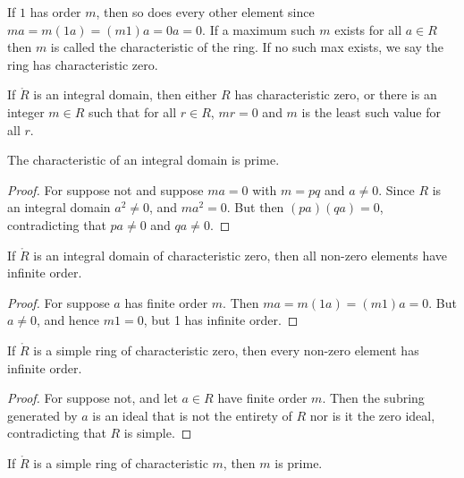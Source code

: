 \documentclass{book}                                                           %
\begin{document}
            If $1$ has order $m$, then so does every other element since
            $ma=m(1a)=(m1)a=0a=0$. If a maximum such $m$ exists for all
            $a\in{R}$ then $m$ is called the characteristic of the ring.
            If no such max exists, we say the ring has characteristic zero.
            \begin{theorem}
                If $\ring{R}$ is an integral domain, then either $R$ has
                characteristic zero, or there is an integer $m\in{R}$ such
                that for all $r\in{R}$, $mr=0$ and $m$ is the least such
                value for all $r$.
            \end{theorem}
            \begin{theorem}
                The characteristic of an integral domain is prime.
            \end{theorem}
            \begin{proof}
                For suppose not and suppose $ma=0$ with $m=pq$ and
                $a\ne{0}$. Since $R$ is an integral domain $a^{2}\ne{0}$,
                and $ma^{2}={0}$. But then $(pa)(qa)=0$, contradicting that
                $pa\ne{0}$ and $qa\ne{0}$.
            \end{proof}
            \begin{theorem}
                If $\ring{R}$ is an integral domain of characteristic zero,
                then all non-zero elements have infinite order.
            \end{theorem}
            \begin{proof}
                For suppose $a$ has finite order $m$. Then
                $ma=m(1a)=(m1)a=0$. But $a\ne{0}$, and hence $m1=0$, but
                1 has infinite order.
            \end{proof}
            \begin{theorem}
                If $\ring{R}$ is a simple ring of characteristic zero, then
                every non-zero element has infinite order.
            \end{theorem}
            \begin{proof}
                For suppose not, and let $a\in{R}$ have finite order $m$.
                Then the subring generated by $a$ is an ideal that is not
                the entirety of $R$ nor is it the zero ideal, contradicting
                that $R$ is simple.
            \end{proof}
            \begin{theorem}
                If $\ring{R}$ is a simple ring of characteristic $m$, then
                $m$ is prime.
            \end{theorem}
\end{document}
